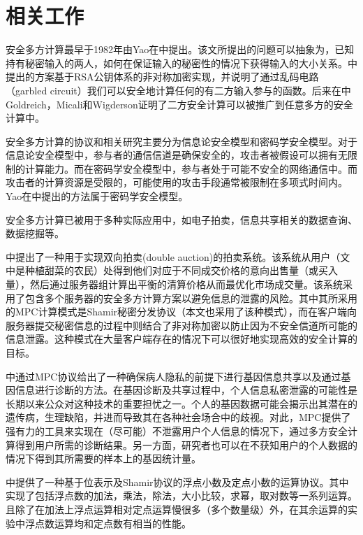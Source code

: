 \chapter{相关工作}

安全多方计算最早于1982年由Yao在中提出。该文所提出的问题可以抽象为，已知持有秘密输入的两人，如何在保证输入的秘密性的情况下获得输入的大小关系。中提出的方案基于RSA公钥体系的非对称加密实现，并说明了通过乱码电路（garbled circuit）我们可以安全地计算任何的有二方输入参与的函数。后来在中Goldreich，Micali和Wigderson证明了二方安全计算可以被推广到任意多方的安全计算中。
	
安全多方计算的协议和相关研究主要分为信息论安全模型和密码学安全模型。对于信息论安全模型中，参与者的通信信道是确保安全的，攻击者被假设可以拥有无限制的计算能力。而在密码学安全模型中，参与者处于可能不安全的网络通信中。而攻击者的计算资源是受限的，可能使用的攻击手段通常被限制在多项式时间内。Yao在中提出的方法属于密码学安全模型。

安全多方计算已被用于多种实际应用中，如电子拍卖，信息共享相关的数据查询、数据挖掘等。

中提出了一种用于实现双向拍卖(double auction)的拍卖系统。该系统从用户（文中是种植甜菜的农民）处得到他们对应于不同成交价格的意向出售量（或买入量），然后通过服务器组计算出平衡的清算价格从而最优化市场成交量。该系统采用了包含多个服务器的安全多方计算方案以避免信息的泄露的风险。其中其所采用的MPC计算模式是Shamir秘密分发协议（本文也采用了该种模式），而在客户端向服务器提交秘密信息的过程中则结合了非对称加密以防止因为不安全信道所可能的信息泄露。这种模式在大量客户端存在的情况下可以很好地实现高效的安全计算的目标。

中通过MPC协议给出了一种确保病人隐私的前提下进行基因信息共享以及通过基因信息进行诊断的方法。在基因诊断及共享过程中，个人信息私密泄露的可能性是长期以来公众对这种技术的重要担忧之一。个人的基因数据可能会揭示出其潜在的遗传病，生理缺陷，并进而导致其在各种社会场合中的歧视。对此，MPC提供了强有力的工具来实现在（尽可能）不泄露用户个人信息的情况下，通过多方安全计算得到用户所需的诊断结果。另一方面，研究者也可以在不获知用户的个人数据的情况下得到其所需要的样本上的基因统计量。

中提供了一种基于位表示及Shamir协议的浮点小数及定点小数的运算协议。其中实现了包括浮点数的加法，乘法，除法，大小比较，求幂，取对数等一系列运算。且除了在加法上浮点运算相对定点运算慢很多（多个数量级）外，在其余运算的实验中浮点数运算均和定点数有相当的性能。
